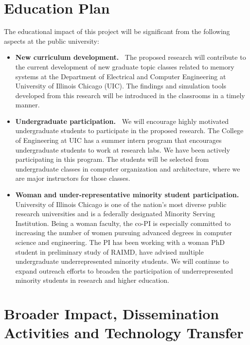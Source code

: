 \documentclass[11pt]{article}
\begin{document}
\section{Education Plan}


The educational impact of this project will be significant from the following
aspects at the public university:

\begin{itemize}

\item{\bf New curriculum development.\ } The proposed research will
contribute to the current development of new graduate topic classes
related to memory systems at the Department of Electrical and Computer
Engineering at University of Illinois Chicago (UIC).  The findings
and simulation tools developed from this research will be introduced
in the classrooms in a timely manner.

\item {\bf Undergraduate participation.\ } We will encourage highly motivated
undergraduate students to participate in the proposed research. The College of
Engineering at UIC has a summer intern program that encourages undergraduate
students to work at research labs. We have been actively participating in this
program.  The students will be selected from undergraduate classes in computer
organization and architecture, where we are major instructors for those classes.

\item {\bf Woman and under-representative minority student participation.\ }
University of Illinois Chicago is one of the nation's most diverse public
research universities and is a federally designated Minority Serving
Institution.  Being a woman faculty, the co-PI is especially committed to
increasing the number of women pursuing advanced degrees in computer science and
engineering. The PI has been working with a woman PhD student in preliminary
study of RAIMD, have advised multiple undergraduate underrepresented minority
students.  We will continue to expand outreach efforts to broaden the
participation of underrepresented minority students in research and higher
education.

\end{itemize}

\section{Broader Impact, Dissemination Activities and Technology
Transfer}
\end{document}
